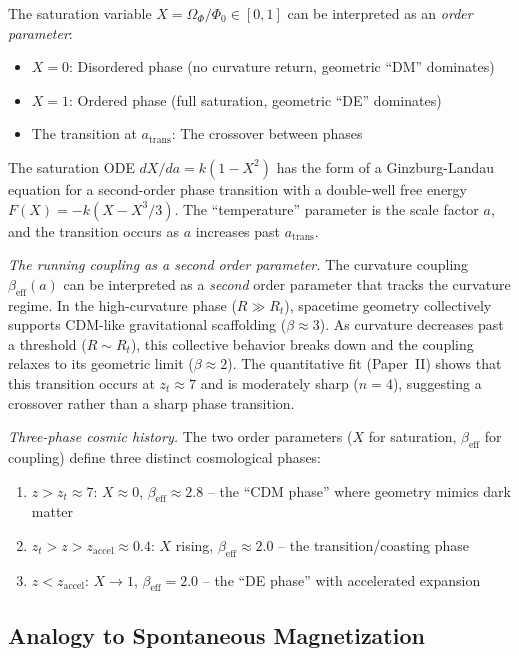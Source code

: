 \documentclass[aps,prd,twocolumn,superscriptaddress,nofootinbib]{revtex4-2}
\begin{document}
The saturation variable $X = \Omega_\Phi / \Phi_0 \in [0, 1]$ can be interpreted as an \textit{order parameter}:
\begin{itemize}
\item $X = 0$: Disordered phase (no curvature return, geometric ``DM'' dominates)
\item $X = 1$: Ordered phase (full saturation, geometric ``DE'' dominates)
\item The transition at $a_{\mathrm{trans}}$: The crossover between phases
\end{itemize}

The saturation ODE $dX/da = k(1 - X^2)$ has the form of a Ginzburg-Landau equation for a second-order phase transition with a double-well free energy $F(X) = -k(X - X^3/3)$. The ``temperature'' parameter is the scale factor $a$, and the transition occurs as $a$ increases past $a_{\mathrm{trans}}$.

\textit{The running coupling as a second order parameter.} The curvature coupling $\beta_{\mathrm{eff}}(a)$ can be interpreted as a \textit{second} order parameter that tracks the curvature regime. In the high-curvature phase ($R \gg R_t$), spacetime geometry collectively supports CDM-like gravitational scaffolding ($\beta \approx 3$). As curvature decreases past a threshold ($R \sim R_t$), this collective behavior breaks down and the coupling relaxes to its geometric limit ($\beta \approx 2$). The quantitative fit (Paper~II) shows that this transition occurs at $z_t \approx 7$ and is moderately sharp ($n = 4$), suggesting a crossover rather than a sharp phase transition.

\textit{Three-phase cosmic history.} The two order parameters ($X$ for saturation, $\beta_{\mathrm{eff}}$ for coupling) define three distinct cosmological phases:
\begin{enumerate}
\item $z > z_t \approx 7$: $X \approx 0$, $\beta_{\mathrm{eff}} \approx 2.8$ -- the ``CDM phase'' where geometry mimics dark matter
\item $z_t > z > z_{\mathrm{accel}} \approx 0.4$: $X$ rising, $\beta_{\mathrm{eff}} \approx 2.0$ -- the transition/coasting phase
\item $z < z_{\mathrm{accel}}$: $X \to 1$, $\beta_{\mathrm{eff}} = 2.0$ -- the ``DE phase'' with accelerated expansion
\end{enumerate}

\subsection{Analogy to Spontaneous Magnetization}
\end{document}
